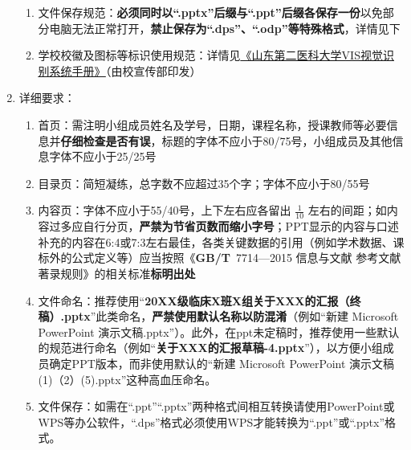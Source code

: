 \begin{enumerate}
\begin{enumerate}
              \item 文件保存规范\footnotemark：\textbf{必须同时以“.pptx”后缀与“.ppt”后缀各保存一份}以免部分电脑无法正常打开，\textbf{禁止保存为“.dps”、“.odp”等特殊格式}，详情见下
              \item 学校校徽及图标等标识使用规范：详情见\uline{\href{https://www.sdsmu.edu.cn/4229/list.htm}{《山东第二医科大学VIS视觉识别系统手册》}}（由校宣传部印发）
          \end{enumerate}
    \item 详细要求：
          \begin{enumerate}
              \item 首页：需注明小组成员姓名及学号，日期，课程名称，授课教师等必要信息并\textbf{仔细检查是否有误}，标题的字体不应小于80/75号，小组成员及其他信息字体不应小于25/25号
              \item 目录页：简短凝练，总字数不应超过35个字；字体不应小于80/55号
              \item 内容页：字体\footnotemark 不应小于55/40号，上下左右应各留出 $\frac{1}{10}$ 左右的间距；如内容过多应自行分页，\textbf{严禁为节省页数而缩小字号}；PPT显示的内容与口述补充的内容在6:4或7:3左右最佳，各类关键数据的引用（例如学术数据、课标外的公式定义等）应当按照\linebreak[3]《\textbf{GB/T}\ 7714—2015 信息与文献 参考文献著录规则》的相关标准\textbf{标明出处}
              \item 文件命名\footnotemark：推荐使用“\textbf{20XX级临床X班X组关于XXX的汇报（终稿）.pptx}”此类命名，\textbf{严禁使用默认名称以防混淆}（例如“新建 Microsoft PowerPoint 演示文稿.pptx”）。此外，在ppt未定稿时，推荐使用一些默认的规范进行命名（例如“\textbf{关于XXX的汇报草稿-4.pptx}”），以方便小组成员确定PPT版本，而非使用默认的“新建 Microsoft PowerPoint 演示文稿(1)（2）(5).pptx”这种高血压命名。
              \item 文件保存\footnotemark：如需在“.ppt”“.pptx”两种格式间相互转换请使用PowerPoint或WPS等办公软件，“.dps”格式必须使用WPS才能转换为“.ppt”或“.pptx”格式。
          \end{enumerate}

\end{enumerate}

